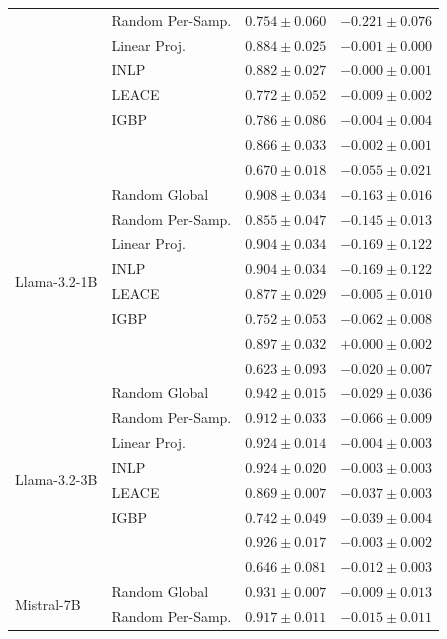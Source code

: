 \begin{longtable}{ll rr}
   & Random Per-Samp. & $0.754{\pm}0.060$ & $-0.221{\pm}0.076$ \\
   & Linear Proj. & $0.884{\pm}0.025$ & $-0.001{\pm}0.000$ \\
   & INLP & $0.882{\pm}0.027$ & $-0.000{\pm}0.001$ \\
   & LEACE & $0.772{\pm}0.052$ & $-0.009{\pm}0.002$ \\
   & IGBP & $0.786{\pm}0.086$ & $-0.004{\pm}0.004$ \\
   & \AmbGCE{} & $0.866{\pm}0.033$ & $-0.002{\pm}0.001$ \\
   & \TanGCE{} & \textbf{$0.670{\pm}0.018$} & $-0.055{\pm}0.021$ \\
  \midrule
  \multirow{8}{*}{Llama-3.2-1B} & Random Global & $0.908{\pm}0.034$ & $-0.163{\pm}0.016$ \\
   & Random Per-Samp. & $0.855{\pm}0.047$ & $-0.145{\pm}0.013$ \\
   & Linear Proj. & $0.904{\pm}0.034$ & $-0.169{\pm}0.122$ \\
   & INLP & $0.904{\pm}0.034$ & $-0.169{\pm}0.122$ \\
   & LEACE & $0.877{\pm}0.029$ & $-0.005{\pm}0.010$ \\
   & IGBP & $0.752{\pm}0.053$ & $-0.062{\pm}0.008$ \\
   & \AmbGCE{} & $0.897{\pm}0.032$ & $+0.000{\pm}0.002$ \\
   & \TanGCE{} & \textbf{$0.623{\pm}0.093$} & $-0.020{\pm}0.007$ \\
  \midrule
  \multirow{8}{*}{Llama-3.2-3B} & Random Global & $0.942{\pm}0.015$ & $-0.029{\pm}0.036$ \\
   & Random Per-Samp. & $0.912{\pm}0.033$ & $-0.066{\pm}0.009$ \\
   & Linear Proj. & $0.924{\pm}0.014$ & $-0.004{\pm}0.003$ \\
   & INLP & $0.924{\pm}0.020$ & $-0.003{\pm}0.003$ \\
   & LEACE & $0.869{\pm}0.007$ & $-0.037{\pm}0.003$ \\
   & IGBP & $0.742{\pm}0.049$ & $-0.039{\pm}0.004$ \\
   & \AmbGCE{} & $0.926{\pm}0.017$ & $-0.003{\pm}0.002$ \\
   & \TanGCE{} & \textbf{$0.646{\pm}0.081$} & $-0.012{\pm}0.003$ \\
  \midrule
  \multirow{8}{*}{Mistral-7B} & Random Global & $0.931{\pm}0.007$ & $-0.009{\pm}0.013$ \\
   & Random Per-Samp. & $0.917{\pm}0.011$ & $-0.015{\pm}0.011$ \\

\end{longtable}
